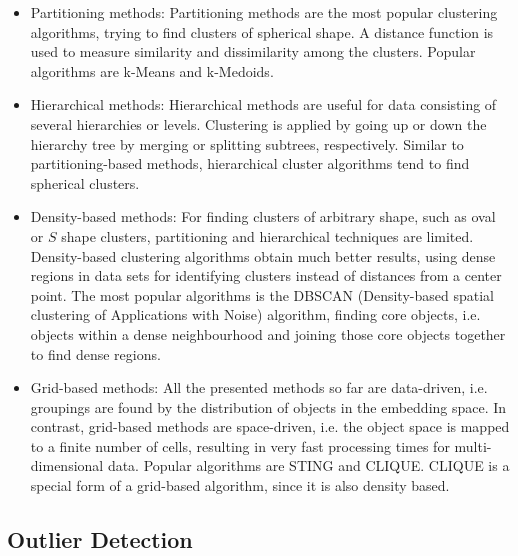 \begin{itemize} 
\item Partitioning methods: Partitioning methods are the most popular clustering algorithms, trying to find clusters of spherical shape. A distance function is used to measure similarity and dissimilarity among the clusters. Popular algorithms are k-Means and k-Medoids. 
\item Hierarchical methods: Hierarchical methods are useful for data consisting of several hierarchies or levels. Clustering is applied by going up or down the hierarchy tree by merging or splitting subtrees, respectively. Similar to partitioning-based methods, hierarchical cluster algorithms tend to find spherical clusters. 
\item Density-based methods: For finding clusters of arbitrary shape, such as oval or $S$ shape clusters, partitioning and hierarchical techniques are limited. Density-based clustering algorithms obtain much better results, using dense regions in data sets for identifying clusters instead of distances from a center point. The most popular algorithms is the DBSCAN (Density-based spatial clustering of Applications with Noise) algorithm, finding core objects, i.e. objects within a dense neighbourhood and joining those core objects together to find dense regions.
\item Grid-based methods: All the presented methods so far are data-driven, i.e. groupings are found by the distribution of objects in the embedding space. In contrast, grid-based methods are space-driven, i.e. the object space is mapped to a finite number of cells, resulting in very fast processing times for multi-dimensional data. Popular algorithms are STING and CLIQUE. CLIQUE is a special form of a grid-based algorithm, since it is also density based.
\end{itemize}





\subsection{Outlier Detection}

